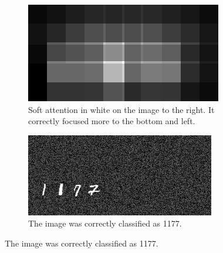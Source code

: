 
\begin{figure}
    \centering
    \begin{subfigure}[c]{0.45\textwidth}
        \centering    \includegraphics[scale=2.0]{resources/MNIST_soft_att/1177_att.jpg}
        \caption{Soft attention in white on the image to the right. It correctly focused more to the bottom and left.}
    \end{subfigure} \quad %
    \begin{subfigure}[c]{0.45\textwidth}
        \centering
        \includegraphics[scale=2.0]{resources/MNIST_soft_att/1177_correct.jpg}
        \caption{The image was correctly classified as 1177.}
    \end{subfigure}


\end{figure}

